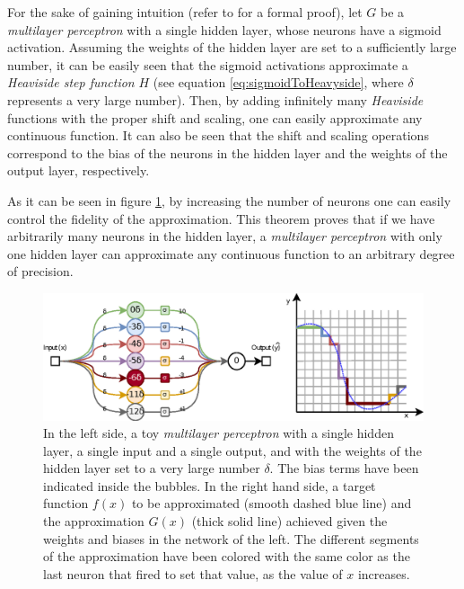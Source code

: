 For the sake of gaining intuition (refer to \citealp{Cybenko1989} for a formal proof), let $G$ be a \textit{multilayer perceptron} with a single hidden layer, whose neurons have a sigmoid activation. Assuming the weights of the hidden layer are set to a sufficiently large number, it can be easily seen that the sigmoid activations approximate a \textit{Heaviside step function} $H$ (see equation \ref{eq:sigmoidToHeavyside}, where $\delta$ represents a very large number). Then, by adding infinitely many \textit{Heaviside} functions with the proper shift and scaling, one can easily approximate any continuous function. It can also be seen that the shift and scaling operations correspond to the bias of the neurons in the hidden layer and the weights of the output layer, respectively.

As it can be seen in figure \ref{fig:universalapprox}, by increasing the number of neurons one can easily control the fidelity of the approximation. This theorem proves that if we have arbitrarily many neurons in the hidden layer, a \textit{multilayer perceptron} with only one hidden layer can approximate any continuous function to an arbitrary degree of precision.


\begin{figure}[h!]
	\centering
	\includegraphics[width=1\linewidth]{background/images/universalapprox}
	\caption[Universal approximation theorem visual example]{In the left side, a toy \textit{multilayer perceptron} with a single hidden layer, a single input and a single output, and with the weights of the hidden layer set to a very large number $\delta$. The bias terms have been indicated inside the bubbles. In the right hand side, a target function $f(x)$ to be approximated (smooth dashed blue line) and the approximation $G(x)$ (thick solid line) achieved given the weights and biases in the network of the left. The different segments of the approximation have been colored with the same color as the last neuron that fired to set that value, as the value of $x$ increases.}
	\label{fig:universalapprox}
\end{figure}

